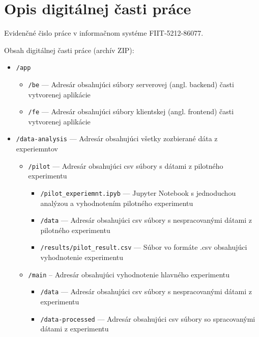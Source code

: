 
\chapter{Opis digitálnej časti práce \label{cha:cdrom} }

\setcounter{page}{1}

Evidenčné čislo práce v informačnom systéme FIIT-5212-86077.

Obsah digitálnej časti práce (archív ZIP):

\begin{itemize}
    \item \texttt{/app}
        \begin{itemize}
            \item \texttt{/be} --- Adresár obsahujúci súbory serverovej (angl. backend) časti vytvorenej aplikácie
            \item \texttt{/fe} --- Adresár obsahujúci súbory klientskej (angl. frontend) časti vytvorenej aplikácie
        \end{itemize}
    \item \texttt{/data-analysis} --- Adresár obsahujúci všetky zozbierané dáta z experiemntov
        \begin{itemize}
            \item \texttt{/pilot} --- Adresár obsahujúci csv súbory s dátami z pilotného experimentu
                \begin{itemize}
                    \item \texttt{/pilot\_experiemnt.ipyb} --- Jupyter Notebook s jednoduchou analýzou a vyhodnotením pilotného experimentu
                    \item \texttt{/data} --- Adresár obsahujúci csv súbory s nespracovanými dátami z pilotného experimentu
                    \item \texttt{/results/pilot\_result.csv} --- Súbor vo formáte .csv obsahujúci vyhodnotenie experimentu
                \end{itemize}
            \item \texttt{/main} -- Adresár obsahujúci vyhodnotenie hlavného experimentu
                \begin{itemize}
                    \item \texttt{/data} --- Adresár obsahujúci csv súbory s nespracovanými dátami z experimentu
                    \item \texttt{/data-processed} --- Adresár obsahujúci csv súbory so spracovanými dátami z experimentu

\end{itemize}
\end{itemize}
\end{itemize}
